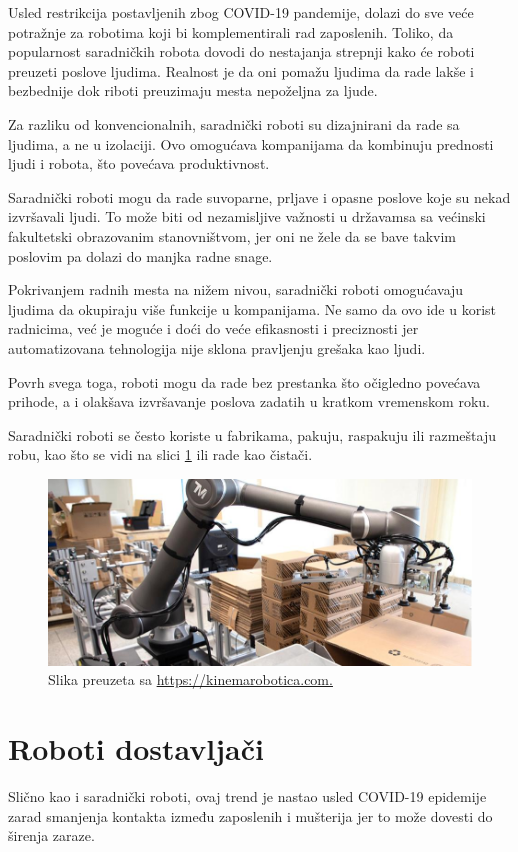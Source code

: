 \documentclass{article}
\begin{document}
	Usled restrikcija postavljenih zbog COVID-19 pandemije, dolazi do sve veće potražnje za robotima koji bi komplementirali rad zaposlenih. Toliko, da popularnost saradničkih robota dovodi do nestajanja strepnji kako će roboti preuzeti poslove ljudima. Realnost je da oni pomažu ljudima da rade lakše i bezbednije dok riboti preuzimaju mesta nepoželjna za ljude.
	
	Za razliku od konvencionalnih, saradnički roboti su dizajnirani da rade sa ljudima, a ne u izolaciji. Ovo omogućava kompanijama da kombinuju prednosti ljudi i robota, što povećava produktivnost. \cite{robotics2022}
	
	Saradnički roboti mogu da rade suvoparne, prljave i opasne poslove koje su nekad izvršavali ljudi. To može biti od nezamisljive važnosti u državamsa sa većinski fakultetski obrazovanim stanovništvom, jer oni ne žele da se bave takvim poslovim pa dolazi do manjka radne snage.
	
	Pokrivanjem radnih mesta na nižem nivou, saradnički roboti omogućavaju ljudima da okupiraju više funkcije u kompanijama. Ne samo da ovo ide u korist radnicima, već je moguće i doći do veće efikasnosti i preciznosti jer automatizovana tehnologija nije sklona pravljenju grešaka kao ljudi.
	
	Povrh svega toga, roboti mogu da rade bez prestanka što očigledno povećava prihode, a i olakšava izvršavanje poslova zadatih u kratkom vremenskom roku. \cite{cobots}
	
	Saradnički roboti se često koriste u fabrikama, pakuju, raspakuju ili razmeštaju robu, kao što se vidi na slici \ref{cobot} ili rade kao čistači. \cite{robots2022}
	
	\begin{figure}
		\centering
		\includegraphics[scale=0.41]{Cobot.jpg}
		\caption{Slika preuzeta sa \url{https://kinemarobotica.com.}}
		\label{cobot}
	\end{figure}
	
	\section{Roboti dostavljači}
	Slično kao i saradnički roboti, ovaj trend je nastao usled COVID-19 epidemije zarad smanjenja kontakta između zaposlenih i mušterija jer to može dovesti do širenja zaraze.
	
\end{document}
